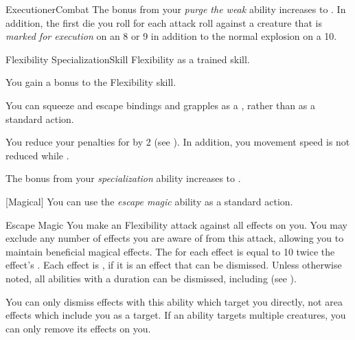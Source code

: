 \begin{feat}{Executioner}{Combat}
         The bonus from your \textit{purge the weak} ability increases to .
        In addition, the first die you roll for each attack roll against a creature that is \textit{marked for execution}  on an 8 or 9 in addition to the normal explosion on a 10.
    \end{feat}

    \begin{feat}{Flexibility Specialization}{Skill}
        \featpre Flexibility as a trained skill.

         You gain a  bonus to the Flexibility skill.

         You can squeeze and escape bindings and grapples as a , rather than as a standard action.

         You reduce your penalties for \squeezing by 2 (see ).
        In addition, you movement speed is not reduced while \squeezing.

         The bonus from your \textit{specialization} ability increases to .

        [Magical] You can use the \textit{escape magic} ability as a standard action.
        \begin{activeability}{Escape Magic}
            \rankline
            You make an Flexibility attack against all  effects on you.
            You may exclude any number of effects you are aware of from this attack, allowing you to maintain beneficial magical effects.
            The  for each effect is equal to 10 \add twice the effect's .
            \hit Each effect is , if it is an effect that can be dismissed.
            Unless otherwise noted, all  abilities with a duration can be dismissed, including  (see ).

            You can only dismiss effects with this ability which target you directly, not area effects which include you as a target.
            If an ability targets multiple creatures, you can only remove its effects on you.
        \end{activeability}
    \end{feat}

